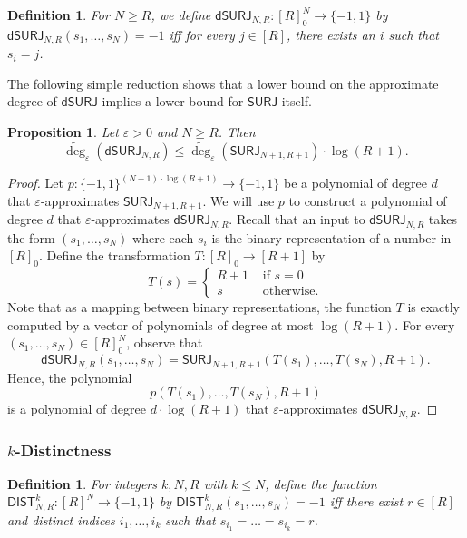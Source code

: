 \documentclass[11pt, letterpaper, fleqn]{article}
\newtheorem{definition}[theorem]{Definition}
\newtheorem{proposition}[theorem]{Proposition}
\theoremstyle{plain}
\newcommand{\SURJ}{\mathsf{ SURJ}}
\newcommand{\DIST}{\mathsf{DIST}}
\newcommand{\dumSURJ}{\mathsf{dSURJ}}
\newcommand{\bits}{\{-1,1\}}
\newcommand{\eps}{\varepsilon}
\newcommand{\adeg}{\widetilde{\operatorname{deg}}}
\begin{document}
\begin{definition}\label{def:dumsurj}
For $N \ge R$, we define $\dumSURJ_{N, R} : [R]_0^N \to \bits$ by $\dumSURJ_{N, R}(s_1, \dots, s_N) = -1$ iff for every $j \in [R]$, there exists an $i$ such that $s_i = j$.
\end{definition}

The following simple reduction shows that a lower bound on the approximate degree of $\dumSURJ$ implies a lower bound for $\SURJ$ itself.

\begin{proposition} \label{prop:dumsurj-reduction}
Let $\eps > 0$ and $N \ge R$. Then
\[ \adeg_\eps(\dumSURJ_{N, R}) \le \adeg_\eps(\SURJ_{N + 1, R + 1}) \cdot \log(R+1).\]
\end{proposition}

\begin{proof}
Let $p : \bits^{(N+1) \cdot \log(R+1)} \to \bits$ be a polynomial of degree $d$ that $\eps$-approximates $\SURJ_{N + 1, R+1}$. We will use $p$ to construct a polynomial of degree $d$ that $\eps$-approximates $\dumSURJ_{N, R}$. Recall that an input to $\dumSURJ_{N, R}$ takes the form $(s_1, \dots, s_N)$ where each $s_i$ is the binary representation of a number in $[R]_0$. Define the transformation $T : [R]_0 \to [R + 1]$ by
\[T(s) = \begin{cases}
R + 1 & \text{ if } s = 0 \\
s & \text{ otherwise}.
\end{cases}\]
Note that as a mapping between binary representations, the function $T$ is exactly computed by a vector of polynomials of degree at most $\log(R+1)$. For every $(s_1, \dots, s_N) \in [R]_0^N$, observe that
\[\dumSURJ_{N, R}(s_1, \dots, s_N) = \SURJ_{N + 1, R+1}(T(s_1), \dots, T(s_N), R+1).\]
Hence, the polynomial
\[p(T(s_1), \dots, T(s_N), R+1)\]
is a polynomial of degree $d \cdot \log(R+1)$ that $\eps$-approximates $\dumSURJ_{N, R}$.
\end{proof}


\subsubsection{$k$-Distinctness}

\begin{definition}
For integers $k, N, R$ with $k \le N$, define the function $\DIST^k_{N, R} : [R]^N \to \bits$ by $\DIST^k_{N, R}(s_1, \dots, s_N) = -1$ iff there exist $r \in [R]$ and distinct indices $i_1, \dots, i_k$ such that $s_{i_1} = \dots = s_{i_k} = r$.
\end{definition}
\end{document}
